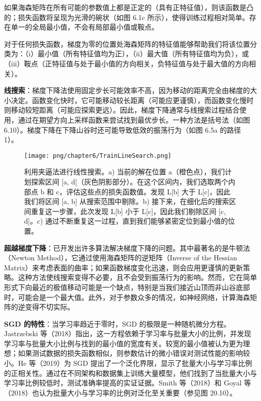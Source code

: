 如果海森矩阵在所有可能的参数值上都是正定的（具有正特征值），则该函数是凸的；损失函数将呈现为光滑的碗状（如图 6.1c 所示），使得训练过程相对简单。存在单一的全局最小值，不会有局部最小值或鞍点。

对于任何损失函数，梯度为零的位置处海森矩阵的特征值能够帮助我们将该位置分类为：（i）最小值（所有特征值均为正），（ii）最大值（所有特征值均为负），或（iii）鞍点（正特征值与处于最小值的方向相关，负特征值与处于最大值的方向相关）。

\textbf{线搜索}：梯度下降法使用固定步长可能效率不高，因为移动的距离完全由梯度的大小决定。函数变化快时，它可能移动较长距离（可能应更谨慎），而函数变化慢时则移动较短距离（可能应探索更远）。因此，梯度下降通常与线搜索过程结合使用，通过在期望方向上采样函数来尝试找到最优步长。一种方法是括号法（如图 6.10）。梯度下降在下降山谷时还可能导致低效的振荡行为（如图 6.5a 的路径 1）。

\begin{figure}[ht!]
\centering
\texttt{[image: png/chapter6/TrainLineSearch.png]}
\caption{利用夹逼法进行线性搜索。a) 当前的解在位置 a（橙色点），我们计划探索区间 [a, d]（灰色阴影部分）。在这个区间内，我们选取两个内部点 b 和 c，评估这些点的损失函数值。发现 L[b] 大于 L[c]，因此我们将区间 [a, b] 从搜索范围中剔除。b) 接下来，在细化后的搜索区间重复这一步骤，此次发现 L[b] 小于 L[c]，因此我们剔除区间 [c, d]。c) 通过不断重复这一过程，直到我们能够紧密定位到最小值的位置。}
\end{figure}

\textbf{超越梯度下降}：已开发出许多算法解决梯度下降的问题。其中最著名的是牛顿法（Newton Method），它通过使用海森矩阵的逆矩阵（Inverse of the Hessian Matrix）来考虑表面的曲率；如果函数梯度变化迅速，则会应用更谨慎的更新策略。这种方法使线搜索变得不必要，且不会受到振荡行为的影响。然而，它在简单形式下向最近的极值移动可能是一个缺点，特别是当我们接近山顶而非山谷底部时，可能会是一个最大值。此外，对于参数众多的情况，如神经网络，计算海森矩阵的逆变得不切实际。

\textbf{SGD 的特性}：当学习率趋近于零时，SGD 的极限是一种随机微分方程。Jastrzebski 等（2018）指出，这一方程依赖于学习率与批量大小的比例，并发现学习率与批量大小比例与找到的最小值的宽度有关。较宽的最小值被认为更为理想；如果测试数据的损失函数相似，则参数估计的微小错误对测试性能的影响较小。He 等（2019）为 SGD 提出了一个泛化界限，显示了批量大小与学习率比例的正相关性。通过在不同架构和数据集上训练大量模型，他们找到了当批量大小与学习率比例较低时，测试准确率提高的实证证据。Smith 等（2018）和 Goyal 等（2018）也认为批量大小与学习率的比例对泛化至关重要（参见图 20.10）。

